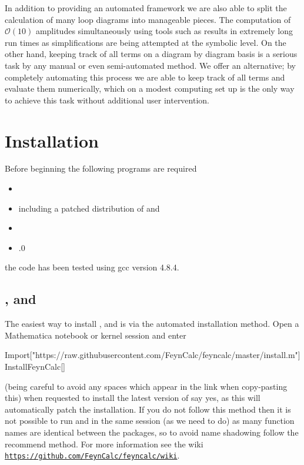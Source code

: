 In addition to providing an automated framework we are also able to split the calculation of many loop diagrams into manageable pieces.  The computation of $\mathcal{O}(10)$ amplitudes simultaneously using tools such as \feyncalc results in extremely long run times as simplifications are being attempted at the symbolic level.  On the other hand, keeping track of all terms on a diagram by diagram basis is a serious task by any manual or even semi-automated method.  We offer an alternative; by completely automating this process we are able to keep track of all terms and evaluate them numerically, which on a modest computing set up is the only way to achieve this task without additional user intervention.


\section{Installation}

Before beginning the following programs are required
\begin{itemize}
\item {}
\item {} including a patched distribution of  and 
\item {}
\item {}.0
\end{itemize}
the \mb \CC code has been tested using gcc version 4.8.4.

\subsection{\feyncalcs, \feynarts and \tarcer}

The easiest way to install \feyncalc, \feynarts and \tarcer is via the automated installation method.  Open a Mathematica notebook or kernel session and enter
\begin{lstterm}
Import["https://raw.githubusercontent.com/FeynCalc/feyncalc/master/install.m"]
InstallFeynCalc[]
\end{lstterm}
(being careful to avoid any spaces which appear in the link when copy-pasting this) when requested to install the latest version of \feynarts say yes, as this will automatically patch the \feynarts installation.  If you do not follow this method then it is not possible to run \feynarts and \feyncalc in the same session (as we need to do) as many function names are identical between the packages, so to avoid name shadowing follow the recommend method.  For more information see the \feyncalc wiki \href{https://github.com/FeynCalc/feyncalc/wiki}{\lstinline{https://github.com/FeynCalc/feyncalc/wiki}}.

